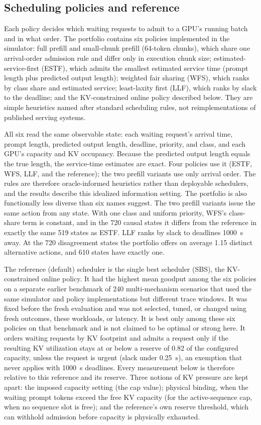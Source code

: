 \documentclass[preprint,12pt]{elsarticle}
\begin{document}
\subsection{Scheduling policies and reference}
\label{sec:policies}
Each policy decides which waiting requests to admit to a GPU's running batch and
in what order. The portfolio contains six policies implemented in the simulator:
full prefill and small-chunk prefill (64-token chunks), which share one
arrival-order admission rule and differ only in execution chunk size;
estimated-service-first (ESTF), which admits the smallest estimated service time
(prompt length plus predicted output length); weighted fair sharing (WFS), which
ranks by class share and estimated service; least-laxity first (LLF), which
ranks by slack to the deadline; and the KV-constrained online policy described
below. They are simple heuristics named after standard scheduling rules, not
reimplementations of published serving systems.

All six read the same observable state: each waiting request's arrival time,
prompt length, predicted output length, deadline, priority, and class, and each
GPU's capacity and KV occupancy. Because the predicted output length equals the
true length, the service-time estimates are exact. Four policies use it (ESTF,
WFS, LLF, and the reference); the two prefill variants use only arrival order.
The rules are therefore oracle-informed heuristics rather than deployable
schedulers, and the results describe this idealized information setting. The
portfolio is also functionally less diverse than six names suggest. The two
prefill variants issue the same action from any state. With one class and
uniform priority, WFS's class-share term is constant, and in the 720 causal
states it differs from the reference in exactly the same 519 states as ESTF.
LLF ranks by slack to deadlines 1000~s away. At the 720 disagreement states the
portfolio offers on average 1.15 distinct alternative actions, and 610 states
have exactly one.

The reference (default) scheduler is the single best scheduler (SBS), the
KV-constrained online policy. It had the highest mean goodput among the six
policies on a separate earlier benchmark of 240 multi-mechanism scenarios that
used the same simulator and policy implementations but different trace windows. It was fixed before the fresh evaluation and was
not selected, tuned, or changed using fresh outcomes, these workloads, or
latency. It is best only among these six policies on that benchmark and is not
claimed to be optimal or strong here. It orders waiting requests by
KV footprint and admits a request only if the resulting KV utilization stays at
or below a reserve of 0.82 of the configured capacity, unless the request is
urgent (slack under 0.25~s), an exemption that never applies with 1000~s
deadlines. Every measurement below is therefore relative to this reference and
its reserve. Three notions of KV pressure are kept apart: the imposed capacity
setting (the cap value); physical binding, when the waiting prompt tokens exceed
the free KV capacity (for the active-sequence cap, when no sequence slot is
free); and the reference's own reserve threshold, which can withhold admission
before capacity is physically exhausted.
\end{document}
